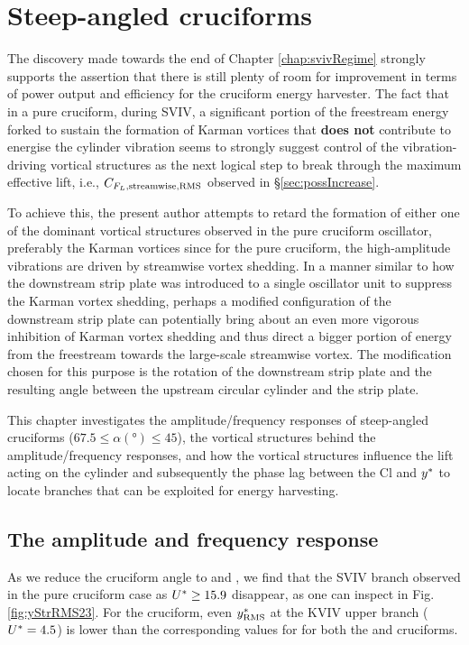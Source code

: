\documentclass[oneside]{utmthesis}
\begin{document}
\chapter{Steep-angled cruciforms}\label{chap:transitionToKarman}
The discovery made towards the end of Chapter \ref{chap:svivRegime} strongly supports the assertion that there is still plenty of room for improvement in terms of power output and efficiency for the cruciform energy harvester. The fact that in a pure cruciform, during SVIV, a significant portion of the freestream energy forked to sustain the formation of Karman vortices that \textbf{does not} contribute to energise the cylinder vibration seems to strongly suggest control of the vibration-driving vortical structures as the next logical step to break through the maximum effective lift, i.e., $C_{F_{L},\text{streamwise},\text{RMS}}$ observed in \S\ref{sec:possIncrease}.

To achieve this, the present author attempts to retard the formation of either one of the dominant vortical structures observed in the pure cruciform oscillator, preferably the Karman vortices since for the pure cruciform, the high-amplitude vibrations are driven by streamwise vortex shedding. In a manner similar to how the downstream strip plate was introduced to a single oscillator unit to suppress the Karman vortex shedding, perhaps a modified configuration of the downstream strip plate can potentially bring about an even more vigorous inhibition of Karman vortex shedding and thus direct a bigger portion of energy from the freestream towards the large-scale streamwise vortex. The modification chosen for this purpose is the rotation of the downstream strip plate and the resulting angle between the upstream circular cylinder and the strip plate.

This chapter investigates the amplitude/frequency responses of steep-angled cruciforms ($67.5 \leq \alpha (\si{\degree}) \leq 45$), the vortical structures behind the amplitude/frequency responses, and how the vortical structures influence the lift acting on the cylinder and subsequently the phase lag between the Cl and $y^{*}$ to locate branches that can be exploited for energy harvesting.

\section{The amplitude and frequency response}\label{sec:transRegimeAmpFreqResp}

As we reduce the cruciform angle to \angfo{} and \angth{}, we find that the SVIV branch observed in the pure cruciform case as $U^{*} \geq 15.9$ disappear, as one can inspect in Fig. \ref{fig:yStrRMS23}. For the \angth{} cruciform, even $y^{*}_{\text{RMS}}$ at the KVIV upper branch ($U^{*} = 4.5$) is lower than the corresponding values for for both the \angfi{} and \angfo{} cruciforms.
\end{document}
